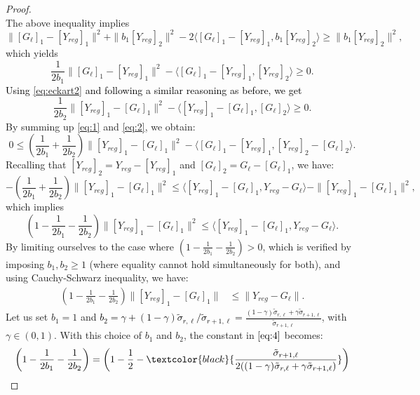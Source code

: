 \documentclass[pdflatex,sn-mathphys-num]{sn-jnl}
\numberwithin{equation}{section}%
\newcommand{\cZ}{G}
\newcommand{\Tsvd}[1]{[ #1 ]_1}
\newcommand{\tsvd}[1]{[ #1 ]_2}
\newcommand{\REV}[1]{\textcolor{black}{#1}}
\newcommand{\ste}[1]{\textcolor{black}{#1}}
\theoremstyle{thmstyleone}%
\theoremstyle{thmstyletwo}%
\theoremstyle{thmstylethree}%
\begin{document}
\begin{proof}
$$$$
The above inequality implies
$$
    \|\Tsvd{\cZ_\ell} - \Tsvd{Y_{reg}} \|^2 + \|b_1 \tsvd{Y_{reg}}\|^2 - 2 \langle \Tsvd{\cZ_\ell} - \Tsvd{Y_{reg}}, b_1 \tsvd{Y_{reg}} \rangle \ge 
    \|b_1 \tsvd{Y_{reg}}\|^2,
$$
which yields     
\begin{equation}\label{eq:1}
    \frac{1}{2b_1} \|\Tsvd{\cZ_\ell} - \Tsvd{Y_{reg}}\|^2 -\langle \Tsvd{\cZ_\ell} - \Tsvd{Y_{reg}}, \tsvd{Y_{reg}} \rangle \ge 0.  
\end{equation}
\REV{Using  \eqref{eq:eckart2} and following a similar reasoning as before, we get}
\begin{equation}
     \frac{1}{2b_2} \|\Tsvd{Y_{reg}} - \Tsvd{\cZ_\ell} \|^2 - \langle \Tsvd{Y_{reg}} - \Tsvd{\cZ_\ell}, \tsvd{\cZ_\ell} \rangle\ge 0. \label{eq:2}
\end{equation}
By summing up \eqref{eq:1} and \eqref{eq:2}, we obtain:
\begin{equation}
     0 \le \left( \frac{1}{2b_1} + \frac{1}{2b_2} \right) \|\Tsvd{Y_{reg}} - \Tsvd{\cZ_\ell}\|^2 - \langle \Tsvd{\cZ_\ell} - \Tsvd{Y_{reg}}, \tsvd{Y_{reg}} - \tsvd{\cZ_\ell} \rangle. \label{eq:3}
\end{equation}
Recalling that $\tsvd{Y_{reg}} = Y_{reg}-\Tsvd{Y_{reg}}$ and $\tsvd{\cZ_\ell} = \cZ_\ell - \Tsvd{\cZ_\ell}$, we have:
$$
    -\left( \frac{1}{2b_1} + \frac{1}{2b_2} \right) \|\Tsvd{Y_{reg}} - \Tsvd{\cZ_\ell} \|^2 \le \langle \Tsvd{Y_{reg}} -\Tsvd{\cZ_\ell} , Y_{reg}-  \cZ_\ell \rangle -  \|\Tsvd{Y_{reg}} - \Tsvd{\cZ_\ell}\|^2, 
$$
which implies
$$
    \left( 1 - \frac{1}{2b_1} - \frac{1}{2b_2} \right) \|\Tsvd{Y_{reg}} - \Tsvd{\cZ_\ell}\|^2 \le \langle \Tsvd{Y_{reg}}-\Tsvd{\cZ_\ell} , Y_{reg} - \cZ_\ell \rangle.
$$
By limiting ourselves to the case where $\left( 1 - \frac{1}{2b_1} - \frac{1}{2b_2} \right) > 0$, which is verified by imposing $b_1, b_2 \ge 1$ (where equality cannot hold simultaneously for both), and using Cauchy-Schwarz inequality, we have:
\begin{align}
    \left( 1 - \frac{1}{2b_1} - \frac{1}{2b_2} \right) \|\Tsvd{Y_{reg}} - \Tsvd{\cZ_\ell}\| &\le \|Y_{reg} - \cZ_\ell\|. \label{eq:4}
\end{align}
Let us set $b_1 = 1$ and \ste{ $b_2 = \gamma + (1-\gamma) \tilde\sigma_{r,\ell}/\tilde\sigma_{r+1,\ell} = \frac{(1 -\gamma) \tilde\sigma_{r,\ell}+\gamma \tilde\sigma_{r+1,\ell}}{\tilde\sigma_{r+1,\ell}}$}, with $\gamma \in (0,1)$. With this choice of $b_1$ and $b_2$, the constant in $\eqref{eq:4}$ becomes:
\begin{align*}
    \left( 1 - \frac{1}{2b_1} - \frac{1}{2b_2} \right) &= \left( 1 - \frac{1}{2} - \ste{\frac{\tilde\sigma_{r+1,\ell}}{2((1-\gamma)\tilde\sigma_{r,\ell}+ \gamma \tilde\sigma_{r+1,\ell})}} \right) \\

\end{align*}
\end{proof}
\end{document}
